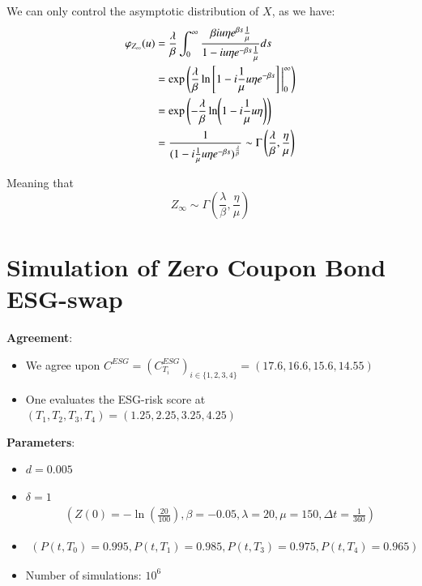 We can only control the asymptotic distribution of $X$, as we have: 
\begin{align*}
\varphi_{Z_{\infty}}(u) &= 
\frac{\lambda}{\beta}
\int_{0}^{\infty} 
\frac{
\beta iu\eta e^{\beta s}\frac{1}{\mu}
}{
1-iu\eta e^{-\beta s} \frac{1}{\mu}
}ds \\ 
&= 
\exp\left(
\frac{\lambda}{\beta}\ln\left[
1- i\frac{1}{\mu}u\eta e^{-\beta s}
\right]\bigg{|}_{0}^{\infty}
\right) \\ 
&= 
\exp\left(
-\frac{\lambda}{\beta}\ln(1-i\frac{1}{\mu}u\eta)
\right) \\ 
&= 
\frac{1}{
(1-i\frac{1}{\mu}u\eta e^{-\beta s})^{\frac{\lambda}{\beta}}
}
\sim \Gamma\left(
\frac{\lambda}{\beta}, \frac{\eta}{\mu}
\right)
\end{align*}

Meaning that
\[
Z_{\infty} \sim \Gamma\left(
\frac{\lambda}{\beta}, \frac{\eta}{\mu}
\right)
\]

\newpage 

\section{Simulation of Zero Coupon Bond ESG-swap}

\textbf{Agreement}: 
\begin{itemize}[leftmargin =*]
    \item We agree upon $C^{ESG} = (C_{T_{i}}^{ESG})_{i\in \{1,2,3,4\}} = (17.6, 16.6, 15.6, 14.55)$ 
    \item One evaluates the ESG-risk score at $(T_{1}, T_{2}, T_{3}, T_{4}) = (1.25, 2.25, 3.25, 4.25)$
\end{itemize}

\textbf{Parameters}:
\begin{itemize}
    \item $d = 0.005$
    \item $\delta = 1$
    \begin{align*}
    \left(
    Z(0) = -\ln(\frac{20}{100}), \beta = -0.05, \lambda = 20, \mu = 150, \Delta t = \frac{1}{360}
    \right)   
\end{align*} 
    \item \begin{align*}
        \left(
        P(t,T_{0}) = 0.995, P(t,T_{1}) = 0.985, P(t,T_{3}) = 0.975, P(t,T_{4}) = 0.965
        \right)
    \end{align*}
    \item Number of simulations: $10^{6}$
\end{itemize}

